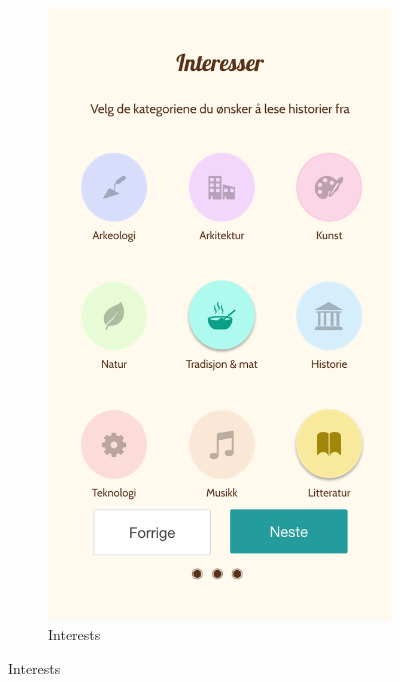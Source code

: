\begin{appendices}
\begin{figure}
\begin{subfigure}[h]{0.3\textwidth}
			\includegraphics[width=\textwidth]{fig/screenshot_interests}
			\caption{Interests}
		\end{subfigure}
		

\end{figure}
\end{appendices}
